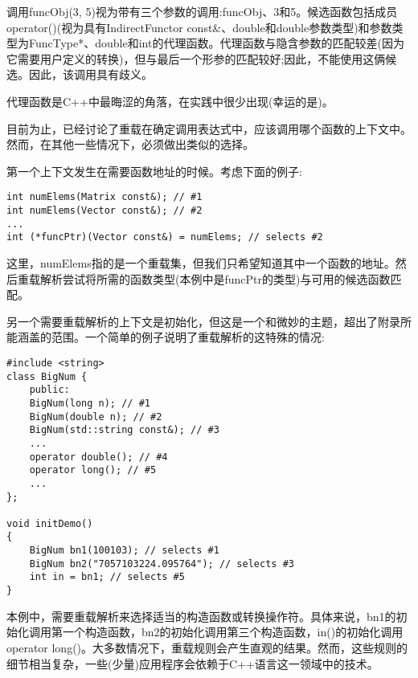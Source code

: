 调用funcObj(3, 5)视为带有三个参数的调用:funcObj、3和5。候选函数包括成员operator()(视为具有IndirectFunctor const\&、double和double参数类型)和参数类型为FuncType*、double和int的代理函数。代理函数与隐含参数的匹配较差(因为它需要用户定义的转换)，但与最后一个形参的匹配较好;因此，不能使用这俩候选。因此，该调用具有歧义。

代理函数是C++中最晦涩的角落，在实践中很少出现(幸运的是)。


目前为止，已经讨论了重载在确定调用表达式中，应该调用哪个函数的上下文中。然而，在其他一些情况下，必须做出类似的选择。

第一个上下文发生在需要函数地址的时候。考虑下面的例子:

\begin{lstlisting}[style=styleCXX]
int numElems(Matrix const&); // #1
int numElems(Vector const&); // #2
...
int (*funcPtr)(Vector const&) = numElems; // selects #2
\end{lstlisting}

这里，numElems指的是一个重载集，但我们只希望知道其中一个函数的地址。然后重载解析尝试将所需的函数类型(本例中是funcPtr的类型)与可用的候选函数匹配。

另一个需要重载解析的上下文是初始化，但这是一个和微妙的主题，超出了附录所能涵盖的范围。一个简单的例子说明了重载解析的这特殊的情况:

\begin{lstlisting}[style=styleCXX]
#include <string>
class BigNum {
	public:
	BigNum(long n); // #1
	BigNum(double n); // #2
	BigNum(std::string const&); // #3
	...
	operator double(); // #4
	operator long(); // #5
	...
};

void initDemo()
{
	BigNum bn1(100103); // selects #1
	BigNum bn2("7057103224.095764"); // selects #3
	int in = bn1; // selects #5
}
\end{lstlisting}

本例中，需要重载解析来选择适当的构造函数或转换操作符。具体来说，bn1的初始化调用第一个构造函数，bn2的初始化调用第三个构造函数，in()的初始化调用operator long()。大多数情况下，重载规则会产生直观的结果。然而，这些规则的细节相当复杂，一些(少量)应用程序会依赖于C++语言这一领域中的技术。













